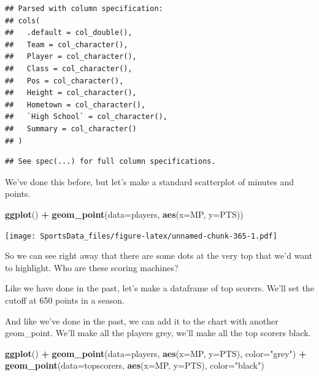 \documentclass[
]{book}
\newenvironment{Shaded}{\begin{snugshade}}{\end{snugshade}}
\newcommand{\DataTypeTok}[1]{\textcolor[rgb]{0.13,0.29,0.53}{#1}}
\newcommand{\DecValTok}[1]{\textcolor[rgb]{0.00,0.00,0.81}{#1}}
\newcommand{\KeywordTok}[1]{\textcolor[rgb]{0.13,0.29,0.53}{\textbf{#1}}}
\newcommand{\NormalTok}[1]{#1}
\newcommand{\OperatorTok}[1]{\textcolor[rgb]{0.81,0.36,0.00}{\textbf{#1}}}
\newcommand{\StringTok}[1]{\textcolor[rgb]{0.31,0.60,0.02}{#1}}
\begin{document}
\begin{verbatim}
## Parsed with column specification:
## cols(
##   .default = col_double(),
##   Team = col_character(),
##   Player = col_character(),
##   Class = col_character(),
##   Pos = col_character(),
##   Height = col_character(),
##   Hometown = col_character(),
##   `High School` = col_character(),
##   Summary = col_character()
## )
\end{verbatim}

\begin{verbatim}
## See spec(...) for full column specifications.
\end{verbatim}

We've done this before, but let's make a standard scatterplot of minutes and points.

\begin{Shaded}
\begin{Highlighting}[]
\KeywordTok{ggplot}\NormalTok{() }\OperatorTok{+}\StringTok{ }\KeywordTok{geom_point}\NormalTok{(}\DataTypeTok{data=}\NormalTok{players, }\KeywordTok{aes}\NormalTok{(}\DataTypeTok{x=}\NormalTok{MP, }\DataTypeTok{y=}\NormalTok{PTS))}
\end{Highlighting}
\end{Shaded}

\texttt{[image: SportsData\_files/figure-latex/unnamed-chunk-365-1.pdf]}

So we can see right away that there are some dots at the very top that we'd want to highlight. Who are these scoring machines?

Like we have done in the past, let's make a dataframe of top scorers. We'll set the cutoff at 650 points in a season.

\begin{Shaded}
\end{Shaded}

And like we've done in the past, we can add it to the chart with another geom\_point. We'll make all the players grey, we'll make all the top scorers black.

\begin{Shaded}
\begin{Highlighting}[]
\KeywordTok{ggplot}\NormalTok{() }\OperatorTok{+}\StringTok{ }\KeywordTok{geom_point}\NormalTok{(}\DataTypeTok{data=}\NormalTok{players, }\KeywordTok{aes}\NormalTok{(}\DataTypeTok{x=}\NormalTok{MP, }\DataTypeTok{y=}\NormalTok{PTS), }\DataTypeTok{color=}\StringTok{"grey"}\NormalTok{) }\OperatorTok{+}\StringTok{ }\KeywordTok{geom_point}\NormalTok{(}\DataTypeTok{data=}\NormalTok{topscorers, }\KeywordTok{aes}\NormalTok{(}\DataTypeTok{x=}\NormalTok{MP, }\DataTypeTok{y=}\NormalTok{PTS), }\DataTypeTok{color=}\StringTok{"black"}\NormalTok{)}
\end{Highlighting}
\end{Shaded}
\end{document}
